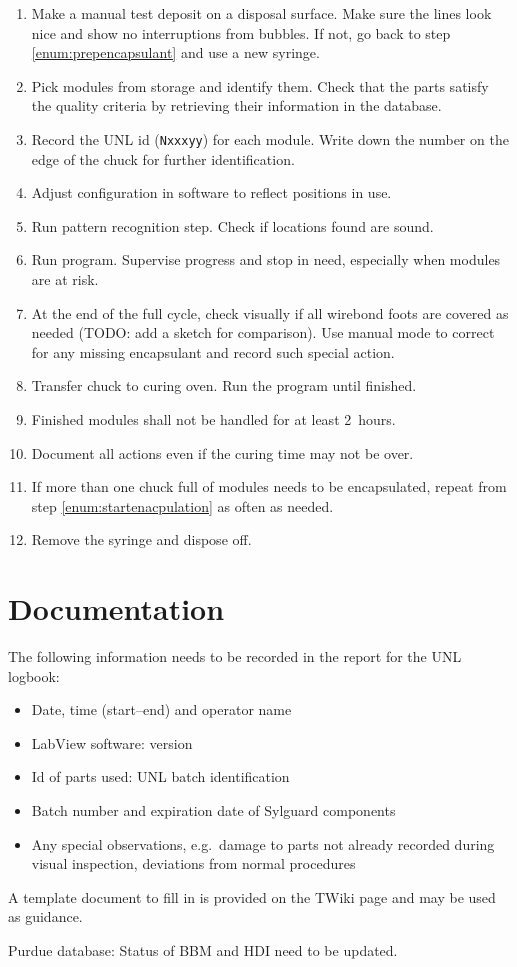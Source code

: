 \documentclass[12pt]{unlsilabsop}
\begin{document}
\begin{enumerate}
    \item Make a manual test deposit on a disposal surface. Make sure the lines look nice and show no interruptions from bubbles. If not, go back to step \ref{enum:prepencapsulant} and use a new syringe.
    \item Pick modules from storage and identify them. Check that the parts satisfy the quality criteria by retrieving their information in the database. \label{enum:startenacpulation}
    \item Record the UNL id (\texttt{Nxxxyy}) for each module. Write down the number on the edge of the chuck for further identification.
    \item Adjust configuration in software to reflect positions in use.
    \item Run pattern recognition step. Check if locations found are sound.
    \item Run program. Supervise progress and stop in need, especially when modules are at risk.
    \item At the end of the full cycle, check visually if all wirebond foots are covered as needed (TODO: add a sketch for comparison). Use manual mode to correct for any missing encapsulant and record such special action.
    \item Transfer chuck to curing oven. Run the program until finished.
    \item Finished modules shall not be handled for at least 2~hours.
    \item Document all actions even if the curing time may not be over.
    \item If more than one chuck full of modules needs to be encapsulated, repeat from step \ref{enum:startenacpulation} as often as needed.
    \item Remove the syringe and dispose off.
\end{enumerate}

\section{Documentation}
The following information needs to be recorded in the report for the UNL logbook:
\begin{itemize}
    \item Date, time (start--end) and operator name
    \item LabView software: version
    \item Id of parts used: UNL batch identification
    \item Batch number and expiration date of Sylguard components
    \item Any special observations, e.g.~damage to parts not already recorded during visual inspection, deviations from normal procedures
\end{itemize}
A template document to fill in is provided on the TWiki page and may be used as guidance.

Purdue database: Status of BBM and HDI need to be updated.
\end{document}
